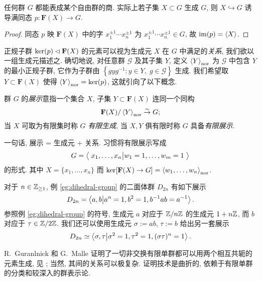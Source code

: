 \begin{proposition}
	任何群 $G$ 都能表成某个自由群的商. 实际上若子集 $X \subset G$ 生成 $G$, 则 $X \hookrightarrow G$ 诱导满同态 $p: \mathbf{F}(X) \to G$.
\end{proposition}
\begin{proof}
	同态 $p$ 映 $\mathbf{F}(X)$ 中的字 $x_1^{\pm 1} \cdots x_n^{\pm 1}$ 为 $x_1^{\pm 1} \cdots x_n^{\pm 1} \in G$, 故 $\operatorname{im}(p) = \left\langle X \right\rangle$.
\end{proof}

正规子群 $\operatorname{ker}(p) \lhd \mathbf{F}(X)$ 的元素可以视为生成元 $X$ 在 $G$ 中满足的\emph{关系}, 我们欲以一组生成元描述之. 确切地说, 对任意群 $\mathcal{G}$ 及其子集 $Y$, 定义 $\left\langle Y \right\rangle_{\text{nor}}$ 为 $\mathcal{G}$ 中包含 $Y$ 的最小正规子群, 它作为子群由 $\left\{ gyg^{-1}: y \in Y, \; g \in \mathcal{G} \right\}$ 生成. 我们希望取 $Y \subset \mathbf{F}(X)$ 使得 $\left\langle Y \right\rangle_{\text{nor}} = \operatorname{ker}(p)$, 这就引向了以下概念.

\begin{definition}[群展示]
	群 $G$ 的\emph{展示}意指一个集合 $X$, 子集 $Y \subset \mathbf{F}(X)$ 连同一个同构
	\[ \mathbf{F}(X)/\left\langle Y \right\rangle_{\mathrm{nor}} \stackrel{\sim}{\rightarrow} G; \]
	当 $X$ 可取为有限集时称 $G$ \emph{有限生成}, 当 $X, Y$ 俱有限时称 $G$ 具备\emph{有限展示}.  
\end{definition}
一句话, 展示 = 生成元 + 关系. 习惯将有限展示写成
\[ G = \left\langle  \; x_1, \ldots, x_n  \big| w_1=1, \ldots, w_m=1 \;  \right\rangle \]
的形式. 其中 $X = \{x_1, \ldots, x_n\}$ 而 $\operatorname{ker}[\mathbf{F}(X) \to G] = \left\langle w_1, \ldots, w_n \right\rangle_\text{nor}$.

\begin{example}\label{eg:dihedral-presentation}
	对于 $n \in \mathbb{Z}_{\geq 1}$, 例 \ref{eg:dihedral-group} 的二面体群 $D_{2n}$ 有如下展示
	\[ D_{2n} = \left\langle  a, b \big| a^n=1, b^2=1, b^{-1}ab = a^{-1}   \right\rangle. \]
	参照例 \ref{eg:dihedral-group} 的符号, 生成元 $a$ 对应于 $\mathbb{Z}/n\mathbb{Z}$ 的生成元 $1+n\mathbb{Z}$, 而 $b$ 对应于 $\tau \in \mathbb{Z}/2\mathbb{Z}$. 我们还可以使用生成元 $\sigma := ab$, $\tau := b$ 给出另一套展示
	\[ D_{2n} \simeq \left\langle  \sigma, \tau \big| \sigma^2=1, \tau^2 = 1, (\sigma\tau)^n=1 \right\rangle. \]
\end{example}

\begin{example}
	R.\ Guranlnick 和 G.\ Malle 证明了一切非交换有限单群都可以用两个相互共轭的元素生成, 见 \cite[Corollary 8.3]{GM12}; 当然, 其间的关系可以极复杂. 证明技术是曲折的, 依赖于有限单群的分类和较深入的群表示论.
\end{example}

